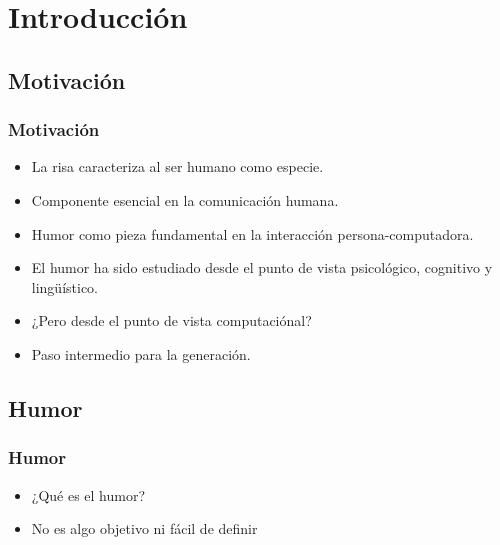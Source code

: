 \section{Introducción} 

\subsection{Motivación}

\begin{frame}[allowframebreaks]
    \frametitle{Motivación}

    \begin{itemize}
        \item La risa caracteriza al ser humano como especie.
        \item Componente esencial en la comunicación humana.
        \item Humor como pieza fundamental en la interacción persona-computadora.
    \end{itemize}

    \framebreak
    
    \begin{itemize}
        \item El humor ha sido estudiado desde el punto de vista psicológico, cognitivo y lingüístico.
        
        \item ¿Pero desde el punto de vista computaciónal?

        \item Paso intermedio para la generación.

    \end{itemize}
\end{frame}

\subsection{Humor}

\begin{frame}
    \frametitle{Humor}

    \begin{itemize}
        \item ¿Qué es el humor?
        \item No es algo objetivo ni fácil de definir
    \end{itemize}
\end{frame}

